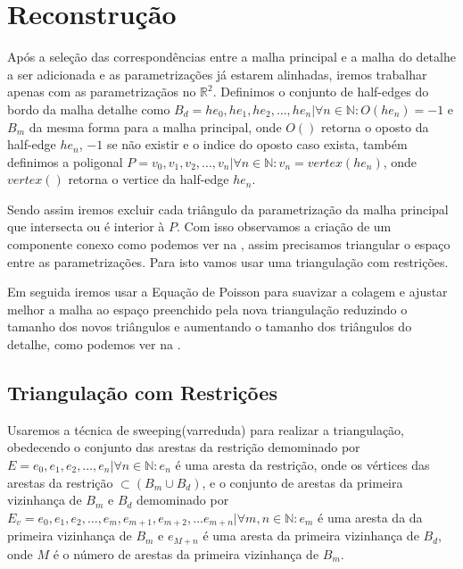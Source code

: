 \section{Reconstrução}
%
Após a seleção das correspondências entre a malha principal e a malha do detalhe a ser
adicionada e as parametrizações já estarem alinhadas, iremos trabalhar apenas com as parametrizaçãos
no $\mathbb{R}^2$. Definimos o conjunto de half-edges do bordo da malha detalhe como 
$B_d = {he_0, he_1, he_2, \ldots, he_n} | \forall n \in \mathbb{N}: O(he_n) = -1$ e
$B_m$ da mesma forma para a malha principal, onde $O( )$ retorna o oposto da half-edge
$he_n$, $-1$ se não existir e o indice do oposto caso exista, também definimos a poligonal
$P = {v_0, v_1, v_2, ..., v_n} | \forall n \in \mathbb{N}: v_n = vertex(he_n)$, onde $vertex( )$ retorna o vertice
da half-edge $he_n$. 

Sendo assim iremos excluir cada triângulo da parametrização da malha principal que intersecta ou é
interior à $P$. Com isso observamos a criação de um componente conexo como podemos ver na ,
assim precisamos triangular o espaço entre as parametrizações. Para isto vamos usar uma triangulação com
restrições.


Em seguida iremos usar a Equação de Poisson para suavizar a colagem e ajustar melhor a malha ao espaço preenchido
pela nova triangulação reduzindo o tamanho dos novos triângulos e aumentando o tamanho dos triângulos do detalhe,
como podemos ver na .

\subsection{Triangulação com Restrições}
%
Usaremos a técnica de sweeping(varreduda) para realizar a triangulação, obedecendo o conjunto das
arestas da restrição demominado por $E = {e_0, e_1, e_2, \ldots, e_n} | \forall n \in \mathbb{N}: e_n$ é uma aresta
da restrição, onde os vértices das arestas da restrição  $ \subset (B_m \cup B_d)$, e o conjunto de arestas da
primeira vizinhança de $B_m$ e $B_d$ demominado por $E_v = {e_0, e_1, e_2, \ldots, e_m, e_{m+1}, e_{m+2}, \ldots
e_{m+n}} | \forall m, n \in \mathbb{N}: e_m$ é uma aresta da da primeira vizinhança de $B_m$ e $e_{M+n}$ é uma aresta
da primeira vizinhança de $B_d$, onde $M$ é o número de arestas da primeira vizinhança de $B_m$.

